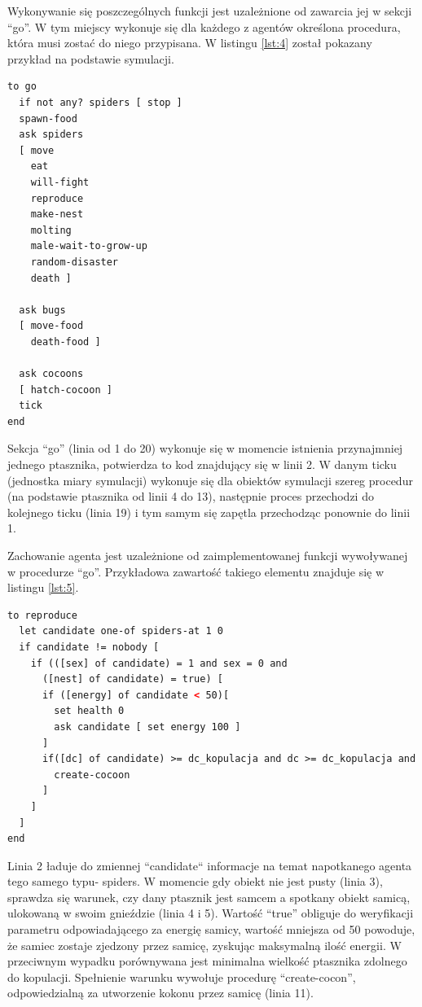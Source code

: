 \documentclass[a4paper,11pt,titlepage]{article}
\begin{document}
Wykonywanie się poszczególnych funkcji jest uzależnione od zawarcia jej w sekcji “go”. W tym miejscy wykonuje się dla każdego z agentów określona procedura, która musi zostać do niego przypisana. W listingu \ref{lst:4} został pokazany przykład na podstawie symulacji.

\begin{lstlisting}[language=HTML, caption= Sekcja ``go'' symulacji., label={lst:4}]
to go
  if not any? spiders [ stop ]
  spawn-food
  ask spiders
  [ move
    eat
    will-fight
    reproduce
    make-nest
    molting
    male-wait-to-grow-up
    random-disaster
    death ]

  ask bugs
  [ move-food
    death-food ]

  ask cocoons
  [ hatch-cocoon ]
  tick
end
\end{lstlisting}

\noindent Sekcja “go” (linia od 1 do 20) wykonuje się w momencie istnienia przynajmniej jednego ptasznika, potwierdza to kod znajdujący się w linii 2. W danym ticku (jednostka miary symulacji) wykonuje się dla obiektów symulacji szereg procedur (na podstawie ptasznika od linii 4 do 13), następnie proces przechodzi do kolejnego ticku (linia 19) i tym samym się zapętla przechodząc ponownie do linii 1.  

Zachowanie agenta jest uzależnione od zaimplementowanej funkcji wywoływanej w procedurze “go”. Przykładowa zawartość takiego elementu znajduje się w listingu \ref{lst:5}.

\begin{lstlisting}[language=HTML, caption= Przykładowa procedura ``reproduce'', label={lst:5}]
to reproduce
  let candidate one-of spiders-at 1 0
  if candidate != nobody [
    if (([sex] of candidate) = 1 and sex = 0 and
      ([nest] of candidate) = true) [
      if ([energy] of candidate < 50)[
        set health 0
        ask candidate [ set energy 100 ]
      ]
      if([dc] of candidate) >= dc_kopulacja and dc >= dc_kopulacja and health != 0[
        create-cocoon
      ]
    ]
  ]
end
\end{lstlisting}

\noindent Linia 2 ładuje do zmiennej “candidate“ informacje na temat napotkanego agenta tego samego typu- spiders. W momencie gdy obiekt nie jest pusty (linia 3), sprawdza się warunek, czy dany ptasznik jest samcem a spotkany obiekt samicą, ulokowaną w swoim gnieździe (linia 4 i 5). Wartość “true” obliguje do weryfikacji parametru odpowiadającego za energię samicy, wartość mniejsza od 50 powoduje, że samiec zostaje zjedzony przez samicę, zyskując maksymalną ilość energii. W przeciwnym wypadku porównywana jest minimalna wielkość ptasznika zdolnego do kopulacji. Spełnienie warunku wywołuje procedurę “create-cocon”, odpowiedzialną za utworzenie kokonu przez samicę (linia 11). 
\end{document}
